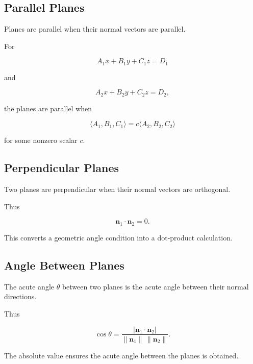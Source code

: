 \subsection{Parallel Planes}
\label{subsec:parallel-planes-vector}

Planes are parallel when their normal vectors are parallel.

For

\[
A_1x+B_1y+C_1z=D_1
\]

and

\[
A_2x+B_2y+C_2z=D_2,
\]

the planes are parallel when

\[
\langle A_1,B_1,C_1\rangle
=
c\langle A_2,B_2,C_2\rangle
\]

for some nonzero scalar \(c\).

\subsection{Perpendicular Planes}
\label{subsec:perpendicular-planes-vector}

Two planes are perpendicular when their normal vectors are orthogonal.

Thus

\[
\boxed{
\mathbf{n}_1\cdot\mathbf{n}_2=0.
}
\]

This converts a geometric angle condition into a dot-product calculation.

\subsection{Angle Between Planes}
\label{subsec:angle-between-planes}

The acute angle \(\theta\) between two planes is the acute angle between
their normal directions.

Thus

\[
\boxed{
\cos\theta
=
\frac{
|\mathbf{n}_1\cdot\mathbf{n}_2|
}{
\|\mathbf{n}_1\|\,\|\mathbf{n}_2\|
}.
}
\]

The absolute value ensures the acute angle between the planes is obtained.

